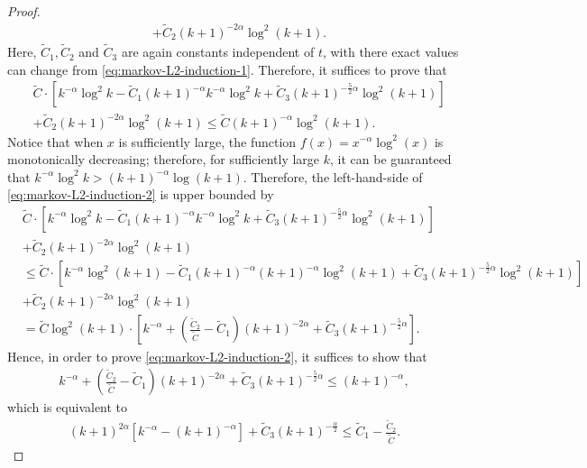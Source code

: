\begin{proof}
\begin{align*}
& + \widetilde{C}_2(k+1)^{-2\alpha} \log^2(k+1).
\end{align*}
Here, $\widetilde{C}_1, \widetilde{C}_2$ and $\widetilde{C}_3$ are again constants independent of $t$, with there exact values can change from \eqref{eq:markov-L2-induction-1}. Therefore, it suffices to prove that
\begin{align}\label{eq:markov-L2-induction-2}
&\widetilde{C} \cdot \left[k^{-\alpha} \log^2 k - \widetilde{C}_1(k+1)^{-\alpha} k^{-\alpha} \log^2 k + \widetilde{C}_3 (k+1)^{-\frac{5}{2}\alpha}\log^2(k+1)\right]\nonumber \\ 
& + \widetilde{C}_2(k+1)^{-2\alpha} \log^2(k+1) \leq \widetilde{C} (k+1)^{-\alpha} \log^2(k+1).
\end{align}
Notice that when $x$ is sufficiently large, the function $f(x) = x^{-\alpha}\log^2(x)$ is monotonically decreasing; therefore, for sufficiently large $k$, it can be guaranteed that $k^{-\alpha} \log^2 k > (k+1)^{-\alpha} \log (k+1)$. Therefore, the left-hand-side of \eqref{eq:markov-L2-induction-2} is upper bounded by
\begin{align*}
&\widetilde{C} \cdot \left[k^{-\alpha} \log^2 k - \widetilde{C}_1(k+1)^{-\alpha} k^{-\alpha} \log^2 k + \widetilde{C}_3 (k+1)^{-\frac{5}{2}\alpha}\log^2(k+1)\right]\\ 
 &+\widetilde{C}_2(k+1)^{-2\alpha} \log^2(k+1) \\ 
&\leq \widetilde{C} \cdot \left[k^{-\alpha} \log^2 (k+1) - \widetilde{C}_1(k+1)^{-\alpha} (k+1)^{-\alpha} \log^2 (k+1) + \widetilde{C}_3 (k+1)^{-\frac{5}{2}\alpha}\log^2(k+1)\right]\\ 
 &+\widetilde{C}_2(k+1)^{-2\alpha} \log^2(k+1) \\ 
 &= \widetilde{C} \log^2(k+1) \cdot \left[k^{-\alpha} +\left(\frac{\widetilde{C}_2}{\widetilde{C}}- \widetilde{C}_1\right)(k+1)^{-2\alpha} + \widetilde{C}_3 (k+1)^{-\frac{5}{2}\alpha} \right].
\end{align*}
Hence, in order to prove \eqref{eq:markov-L2-induction-2}, it suffices to show that
\begin{align*}
k^{-\alpha} +\left(\frac{\widetilde{C}_2}{\widetilde{C}}- \widetilde{C}_1\right)(k+1)^{-2\alpha} + \widetilde{C}_3 (k+1)^{-\frac{5}{2}\alpha} \leq (k+1)^{-\alpha},
\end{align*}
which is equivalent to
\begin{align*}
(k+1)^{2\alpha}\left[k^{-\alpha} - (k+1)^{-\alpha}\right] + \widetilde{C}_3 (k+1)^{-\frac{\alpha}{2}} \leq \widetilde{C}_1 - \frac{\widetilde{C}_2}{\widetilde{C}}.

\end{align*}
\end{proof}
